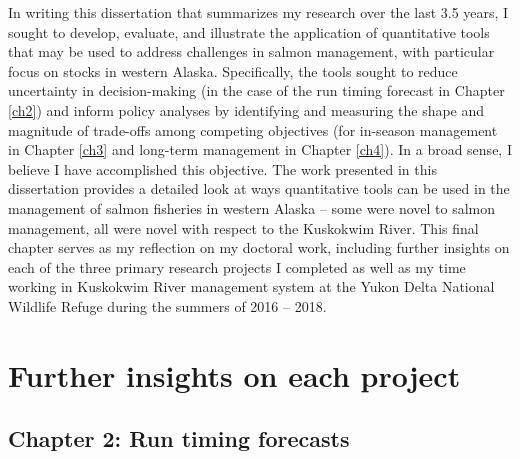 \documentclass[12pt,]{book}
\theoremstyle{definition}
\theoremstyle{definition}
\theoremstyle{definition}
\theoremstyle{remark}
\begin{document}
\noindent
In writing this dissertation that summarizes my research over the last
3.5 years, I sought to develop, evaluate, and illustrate the application
of quantitative tools that may be used to address challenges in salmon
management, with particular focus on stocks in western Alaska.
Specifically, the tools sought to reduce uncertainty in decision-making
(in the case of the run timing forecast in Chapter \ref{ch2}) and inform
policy analyses by identifying and measuring the shape and magnitude of
trade-offs among competing objectives (for in-season management in
Chapter \ref{ch3} and long-term management in Chapter \ref{ch4}). In a
broad sense, I believe I have accomplished this objective. The work
presented in this dissertation provides a detailed look at ways
quantitative tools can be used in the management of salmon fisheries in
western Alaska -- some were novel to salmon management, all were novel
with respect to the Kuskokwim River. This final chapter serves as my
reflection on my doctoral work, including further insights on each of
the three primary research projects I completed as well as my time
working in Kuskokwim River management system at the Yukon Delta National
Wildlife Refuge during the summers of 2016 -- 2018.

\section{Further insights on each
project}\label{further-insights-on-each-project}

\subsection{Chapter 2: Run timing
forecasts}\label{chapter-2-run-timing-forecasts}
\end{document}

